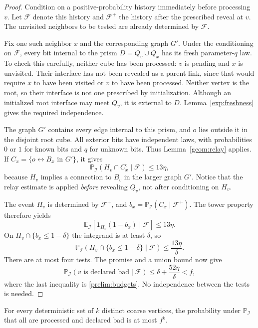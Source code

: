\begin{proof}
Condition on a positive-probability history immediately before
processing $v$. Let $\mathcal F$ denote this history and
$\mathcal F^+$ the history after the prescribed reveal at $v$.
The unvisited neighbors to be tested are already determined by
$\mathcal F$.

Fix one such neighbor $x$ and the corresponding graph $G'$. Under the
conditioning on $\mathcal F$, every bit internal to the prism
$D=Q_v\cup Q_x$ has its fresh parameter-$q$ law. To check this carefully,
neither cube has been processed: $v$ is pending and $x$ is unvisited.
Their interface has not been revealed as a parent link, since that
would require $x$ to have been visited or $v$ to have been processed.
Neither vertex is the root, so their interface is not one prescribed
by initialization. Although an initialized root interface may meet
$Q_v$, it is external to $D$. Lemma~\ref{exp:freshness} gives the
required independence.

The graph $G'$ contains every edge internal to this prism, and $o$ lies
outside it in the disjoint root cube. All exterior bits have independent
laws, with probabilities $0$ or $1$ for known bits and $q$ for unknown
bits. Thus Lemma~\ref{geom:relay} applies. If
$C_x=\{o\leftrightarrow B_x\text{ in }G'\}$, it gives
\[
 \mathbb P_{\mathcal I}(H_v\cap C_x^{\mathrm c}\mid\mathcal F)
 \le 13\eta,
\]
because $H_v$ implies a connection to $B_v$ in the larger graph $G'$.
Notice that the relay estimate is applied \emph{before} revealing
$Q_v$, not after conditioning on $H_v$.

The event $H_v$ is determined by $\mathcal F^+$, and
$b_x=\mathbb P_{\mathcal I}(C_x\mid\mathcal F^+)$. The tower property
therefore yields
\[
 \mathbb E_{\mathcal I}
   [\mathbf 1_{H_v}(1-b_x)\mid\mathcal F]\le13\eta.
\]
On $H_v\cap\{b_x\le1-\delta\}$ the integrand is at least $\delta$,
so
\[
 \mathbb P_{\mathcal I}
   (H_v\cap\{b_x\le1-\delta\}\mid\mathcal F)
 \le\frac{13\eta}{\delta}.
\]
There are at most four tests. The promise and a union bound now give
\[
 \mathbb P_{\mathcal I}(v\text{ is declared bad}\mid\mathcal F)
 \le\delta+\frac{52\eta}{\delta}<f,
\]
where the last inequality is \eqref{prelim:budgets}. No independence
between the tests is needed.
\end{proof}

\begin{lemma}
\label{exp:bad-set}
For every deterministic set of $k$ distinct coarse vertices, the
probability under $\mathbb P_{\mathcal I}$ that all are processed and
declared bad is at most $f^k$.
\end{lemma}

